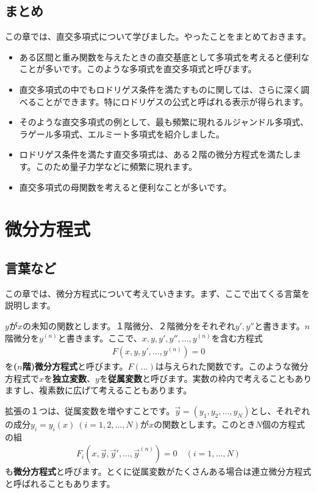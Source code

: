 \documentclass[report,paper=a4, fontsize=12pt, line_length=16cm, number_of_lines=33,dvipdfmx]{jlreq}
\numberwithin{equation}{section}
\newcommand{\strong}[1]{\textsf{\bfseries #1}}
\newcommand{\yv}{\vec{y}}
\begin{document}
\section{まとめ}
この章では、直交多項式について学びました。やったことをまとめておきます。
\begin{itemize}
  \item ある区間と重み関数を与えたときの直交基底として多項式を考えると便利なことが多いです。このような多項式を直交多項式と呼びます。
  \item 直交多項式の中でもロドリゲス条件を満たすものに関しては、さらに深く調べることができます。特にロドリゲスの公式と呼ばれる表示が得られます。
  \item そのような直交多項式の例として、最も頻繁に現れるルジャンドル多項式、ラゲール多項式、エルミート多項式を紹介しました。
  \item ロドリゲス条件を満たす直交多項式は、ある２階の微分方程式を満たします。このため量子力学などに頻繁に現れます。
  \item 直交多項式の母関数を考えると便利なことが多いです。
\end{itemize}


\chapter{微分方程式}\label{sec:ode}
\section{言葉など}
この章では、微分方程式について考えていきます。まず、ここで出てくる言葉を説明します。

$y$が$x$の未知の関数とします。１階微分、２階微分をそれぞれ$y',y''$と書きます。$n$階微分を$y^{(n)}$と書きます。ここで、$x,y,y',y'',\dots,y^{(n)}$を含む方程式
\begin{align}
  F(x,y,y',\dots,y^{(n)})=0
\end{align}
を\strong{($n$階)微分方程式}と呼びます。$F(...)$は与えられた関数です。このような微分方程式で$x$を\strong{独立変数}、$y$を\strong{従属変数}と呼びます。実数の枠内で考えることもありますし、複素数に広げて考えることもあります。

拡張の１つは、従属変数を増やすことです。$\yv=(y_1,y_2,\dots,y_N)$とし、それぞれの成分$y_i=y_i(x)\ (i=1,2,\dots,N)$が$x$の関数とします。このとき$N$個の方程式の組
\begin{align}
  F_i(x,\yv,\yv',\dots,\yv^{(n)})=0\quad (i=1,\dots,N)
\end{align}
も\strong{微分方程式}と呼びます。とくに従属変数がたくさんある場合は連立微分方程式と呼ばれることもあります。
\end{document}
